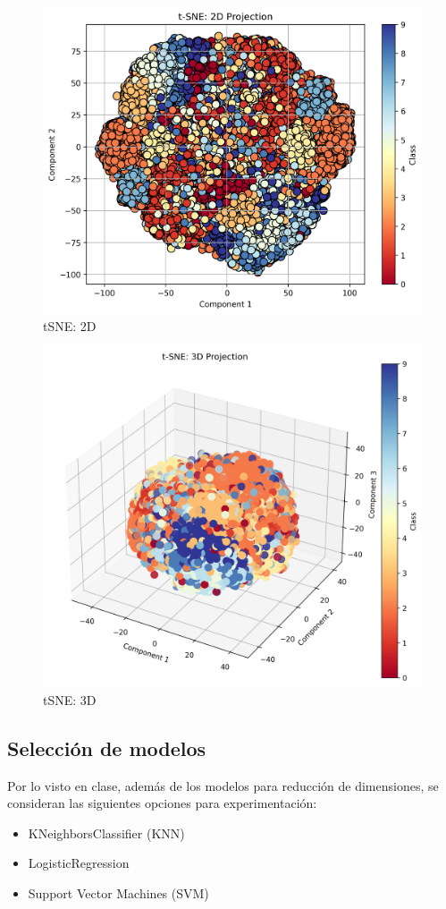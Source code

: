 \documentclass[journal]{IEEEtran}
\begin{document}
\begin{figure}[H]
        \centering
        \includegraphics[width=0.9\linewidth]{figures/tsne_2d_projection.png}
        \caption{tSNE: 2D}
        \label{fig:tsne_2d}
\end{figure}
\begin{figure}[H]
        \centering
        \includegraphics[width=0.9\linewidth]{figures/tsne_3d_projection.png}
        \caption{tSNE: 3D}
        \label{fig:tsne_3d}
\end{figure}

\subsection{Selección de modelos}
Por lo visto en clase, además de los modelos para reducción de dimensiones, se consideran las siguientes opciones para experimentación:
\begin{itemize}
        \item KNeighborsClassifier (KNN)\cite{scikit-learn-knn}
        \item LogisticRegression\cite{scikit-learn-logreg}
        \item Support Vector Machines (SVM)\cite{scikit-learn-svm}
\end{itemize}
\end{document}
